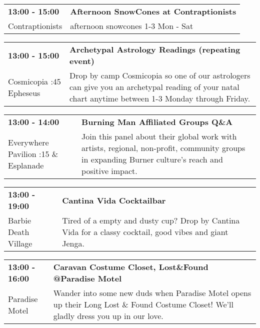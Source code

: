 \begin{tabular}{ p{1in} p{2.2in} }
    \textbf{13:00 - 15:00} & \textbf{Afternoon SnowCones at Contraptionists} \\
    Contraptionists \newline  & afternoon snowcones 1-3 Mon - Sat \\
    \hline 
\end{tabular}
    
\begin{tabular}{ p{1in} p{2.2in} }
    \textbf{13:00 - 15:00} & \textbf{Archetypal Astrology Readings (repeating event)} \\
    Cosmicopia \newline 3:45 Epheseus & Drop by camp Cosmicopia so one of our astrologers can give you an archetypal reading of your natal chart anytime between 1-3 Monday through Friday. \\
    \hline 
\end{tabular}
    
\begin{tabular}{ p{1in} p{2.2in} }
    \textbf{13:00 - 14:00} & \textbf{Burning Man Affiliated Groups Q\&A} \\
    Everywhere Pavilion \newline 6:15 \& Esplanade & Join this panel about their global work with artists, regional, non-profit, community groups in expanding Burner culture's reach and positive impact. \\
    \hline 
\end{tabular}
    
\begin{tabular}{ p{1in} p{2.2in} }
    \textbf{13:00 - 19:00} & \textbf{Cantina Vida Cocktailbar} \\
    Barbie Death Village \newline  & Tired of a empty and dusty cup? Drop by Cantina Vida for a classy cocktail, good vibes and giant Jenga. \\
    \hline 
\end{tabular}
    
\begin{tabular}{ p{1in} p{2.2in} }
    \textbf{13:00 - 16:00} & \textbf{Caravan Costume Closet, Lost\&Found @Paradise Motel} \\
    Paradise Motel \newline  & Wander into some new duds when Paradise Motel opens up their Long Lost \& Found Costume Closet! We'll gladly dress you up in our love. \\
    \hline 
\end{tabular}
    
